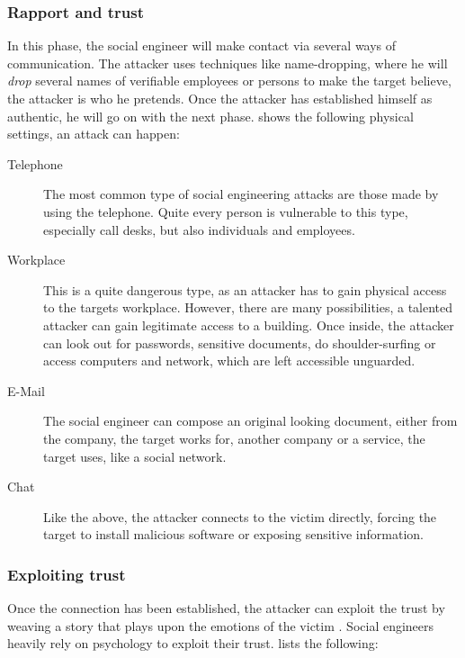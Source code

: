 \subsubsection{Rapport and trust}

In this phase, the social engineer will make contact via several ways of
communication. The attacker uses techniques like name-dropping, where he will
\textit{drop} several names of verifiable employees or persons to make the target
believe, the attacker is who he pretends. Once the attacker has established
himself as authentic, he will go on with the next phase. \cite{jones2004} shows
the following physical settings, an attack can happen:

\begin{description}
\item[Telephone] The most common type of social engineering attacks are those
  made by using the telephone. Quite every person is vulnerable to this type,
  especially call desks, but also individuals and employees.
\item[Workplace] This is a quite dangerous type, as an attacker has to gain
  physical access to the targets workplace. However, there are many
  possibilities, a talented attacker can gain legitimate access to a building.
  Once inside, the attacker can look out for passwords, sensitive documents,
  do shoulder-surfing or access computers and network, which are left
  accessible unguarded.
\item[E-Mail] The social engineer can compose an original looking document,
  either from the company, the target works for, another company or a service,
  the target uses, like a social network.
\item[Chat] Like the above, the attacker connects to the victim directly,
  forcing the target to install malicious software or exposing sensitive
  information.
\end{description}


\subsubsection{Exploiting trust}

Once the connection has been established, the attacker can exploit the trust by
\glqq{}weaving a story that plays upon the emotions of the
victim\grqq{} \cite{thornburgh2004}. Social engineers heavily rely on
psychology to exploit their trust. \cite{jones2004} lists the following:

